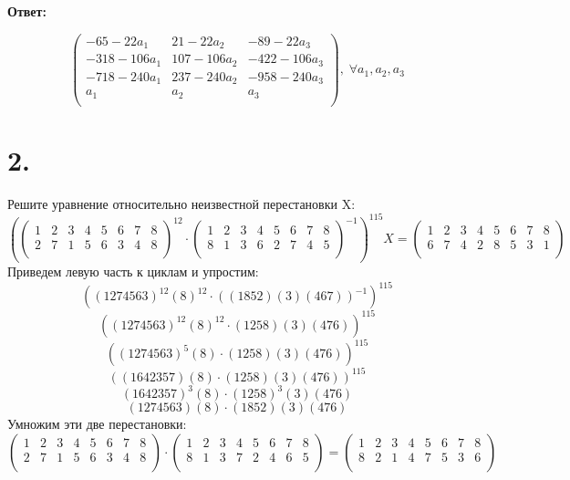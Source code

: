\documentclass[a4paper,12pt]{article}
\begin{document}
\begin{center}
\textbf{Ответ:}
\end{center}
\begin{center}
\[
\begin{pmatrix}
-65 - 22a_1 & 21 - 22a_2 & -89 - 22a_3 \\
-318 - 106a_1 & 107 - 106a_2 & -422 - 106a_3 \\
-718 - 240a_1 & 237 - 240a_2 & -958 - 240a_3\\
a_1 & a_2 & a_3 \\
\end{pmatrix}, \; \forall a_1, a_2, a_3
\]
\end{center}
\newpage
\section*{2.} Решите уравнение относительно неизвестной перестановки X:
\[
\left(
\begin{pmatrix}
1 & 2 & 3 & 4 & 5 & 6 & 7 & 8 \\
2 & 7 & 1 & 5 & 6 & 3 & 4 & 8 \\
\end{pmatrix}^{12}
\cdot
\begin{pmatrix}
1 & 2 & 3 & 4 & 5 & 6 & 7 & 8 \\
8 & 1 & 3& 6 & 2 & 7 & 4 & 5 \\
\end{pmatrix}^{-1} 
\right)^{115} 
X
= 
\begin{pmatrix}
1 & 2 & 3 & 4 & 5 & 6 & 7 & 8 \\
6 & 7& 4& 2 & 8 & 5 & 3 & 1 \\
\end{pmatrix}
\]
Приведем левую часть к циклам и упростим:
\[
\left(
(1274563)^{12}(8)^{12} \cdot \left( (1852)(3)(467) \right)^{-1}
\right)^{115}
\]
\[
\left( 
(1274563)^{12}(8)^{12} \cdot (1258)(3)(476)
\right)^{115}
\]
\[
\left( 
(1274563)^{5}(8)\cdot (1258)(3)(476)
\right)^{115}
\]
\[
\left(
(1642357)(8) \cdot (1258)(3)(476)
\right)^{115}
\]
\[
(1642357)^{3}(8) \cdot (1258)^{3}(3)(476)
\]
\[
(1274563)(8) \cdot (1852)(3)(476)
\]
Умножим эти две перестановки:
\[
\begin{pmatrix}
1 & 2 & 3 & 4 & 5 & 6 & 7 & 8 \\
2 & 7 & 1 & 5 & 6 & 3 & 4 & 8\\
\end{pmatrix} 
\cdot
\begin{pmatrix}
1 & 2 & 3 & 4 & 5 & 6 & 7 & 8 \\
8 & 1 & 3 & 7 & 2 & 4& 6 & 5\\
\end{pmatrix} 
=
\begin{pmatrix}
1 & 2 & 3 & 4 & 5 & 6 & 7 & 8 \\
8 & 2 & 1 & 4 & 7 & 5 & 3 & 6\\
\end{pmatrix} 
\]
\end{document}
